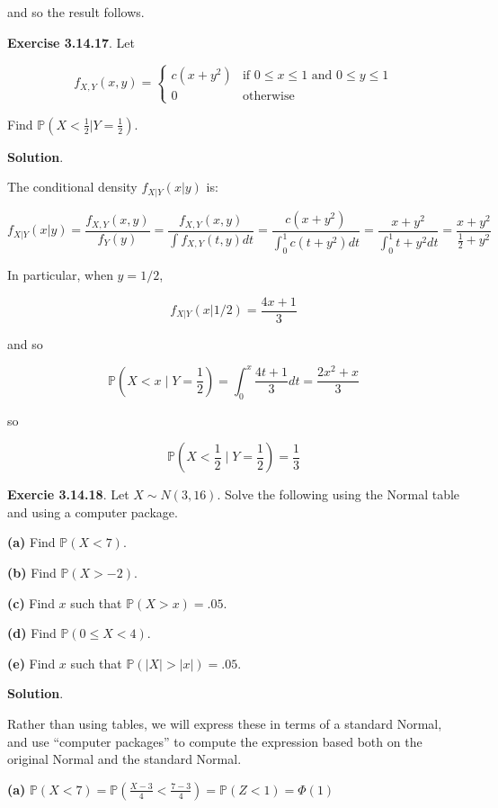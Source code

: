 and so the result follows.

\textbf{Exercise 3.14.17}. Let

\[
f_{X, Y}(x, y) = \begin{cases}
c(x + y^2) &\text{if } 0 \leq x \leq 1 \text{ and }  0 \leq y \leq 1 \\
0 & \text{otherwise}
\end{cases}
\]

Find \(\mathbb{P}\left( X < \frac{1}{2} | Y = \frac{1}{2} \right)\).

\textbf{Solution}.

The conditional density \(f_{X | Y}(x | y)\) is:

\[ f_{X|Y}(x | y) = \frac{f_{X, Y}(x, y)}{f_Y(y)} = \frac{f_{X, Y}(x, y)}{\int f_{X, Y}(t, y) dt}
= \frac{ c(x + y^2) }{\int_0^1 c(t + y^2) dt} =  \frac{ x + y^2 }{\int_0^1 t + y^2 dt} = \frac{x + y^2}{\frac{1}{2} + y^2} \]

In particular, when \(y = 1/2\),

\[f_{X|Y}(x | 1/2) = \frac{4x + 1}{3}\]

and so

\[ \mathbb{P}\left( X < x \;\Bigg|\; Y = \frac{1}{2} \right) = \int_0^x \frac{4t + 1}{3} dt = \frac{2x^2 + x}{3} \]

so

\[ \mathbb{P}\left( X < \frac{1}{2} \;\Bigg|\; Y = \frac{1}{2} \right) = \frac{1}{3} \]

\textbf{Exercie 3.14.18}. Let \(X \sim N(3, 16)\). Solve the following
using the Normal table and using a computer package.

\textbf{(a)} Find \(\mathbb{P}(X < 7)\).

\textbf{(b)} Find \(\mathbb{P}(X > -2)\).

\textbf{(c)} Find \(x\) such that \(\mathbb{P}(X > x) = .05\).

\textbf{(d)} Find \(\mathbb{P}(0 \leq X < 4)\).

\textbf{(e)} Find \(x\) such that \(\mathbb{P}(|X| > |x|) = .05\).

\textbf{Solution}.

Rather than using tables, we will express these in terms of a standard
Normal, and use ``computer packages'' to compute the expression based
both on the original Normal and the standard Normal.

\textbf{(a)}
\(\mathbb{P}(X < 7) = \mathbb{P}\left(\frac{X - 3}{4} < \frac{7 - 3}{4} \right) = \mathbb{P}\left(Z < 1 \right) = \Phi\left( 1 \right)\)

